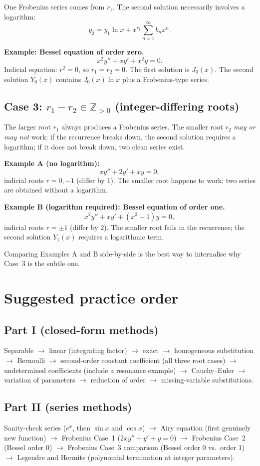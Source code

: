 \documentclass{essay}
\begin{document}
One Frobenius series comes from $r_1$.  The second solution necessarily involves a logarithm:
\[
  y_2 = y_1 \ln x + x^{r_1}\sum_{n=1}^{\infty} b_n x^n.
\]

\textbf{Example: Bessel equation of order zero.}
\[
  x^2 y'' + xy' + x^2 y = 0.
\]
Indicial equation: $r^2 = 0$, so $r_1 = r_2 = 0$.  The first solution is $J_0(x)$.  The second solution $Y_0(x)$ contains $J_0(x)\ln x$ plus a Frobenius-type series.

\subsection*{Case 3: $r_1 - r_2 \in \mathbb{Z}_{>0}$ (integer-differing roots)}

The larger root $r_1$ always produces a Frobenius series.  The smaller root $r_2$ \emph{may or may not} work: if the recurrence breaks down, the second solution requires a logarithm; if it does not break down, two clean series exist.

\medskip
\noindent\textbf{Example A (no logarithm):}
\[
  xy'' + 2y' + xy = 0,
\]
indicial roots $r = 0, -1$ (differ by 1).  The smaller root happens to work; two series are obtained without a logarithm.

\medskip
\noindent\textbf{Example B (logarithm required): Bessel equation of order one.}
\[
  x^2 y'' + xy' + (x^2 - 1)y = 0,
\]
indicial roots $r = \pm 1$ (differ by 2).  The smaller root fails in the recurrence; the second solution $Y_1(x)$ requires a logarithmic term.

\medskip
Comparing Examples A and B side-by-side is the best way to internalise why Case~3 is the subtle one.

\section{Suggested practice order}

\subsection*{Part I (closed-form methods)}

Separable $\to$ linear (integrating factor) $\to$ exact $\to$ homogeneous substitution $\to$ Bernoulli $\to$ second-order constant coefficient (all three root cases) $\to$ undetermined coefficients (include a resonance example) $\to$ Cauchy--Euler $\to$ variation of parameters $\to$ reduction of order $\to$ missing-variable substitutions.

\subsection*{Part II (series methods)}

Sanity-check series ($e^x$, then $\sin x$ and $\cos x$) $\to$ Airy equation (first genuinely new function) $\to$ Frobenius Case~1 ($2xy'' + y' + y = 0$) $\to$ Frobenius Case~2 (Bessel order 0) $\to$ Frobenius Case~3 comparison (Bessel order 0 vs.\ order 1) $\to$ Legendre and Hermite (polynomial termination at integer parameters).
\end{document}
